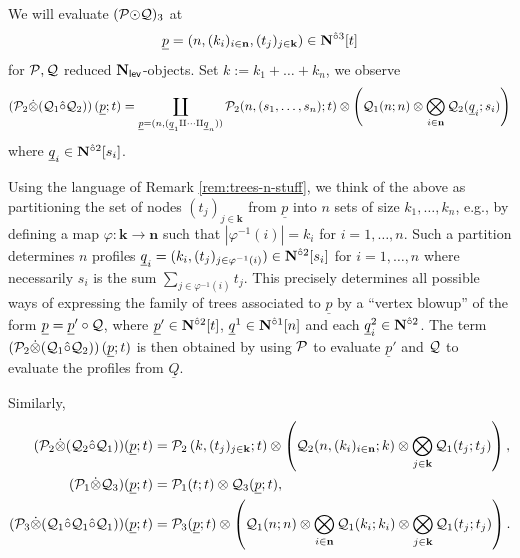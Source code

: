 \begin{example} 
We will evaluate $(\mathcal{P}{\odot}\mathcal{Q})_3$ at \[\underline{p}=(n, (k_i)_{i\in \mathbf{n}}, (t_j)_{j\in \mathbf{k}})\in\mathbf{N}^{\hat{\circ}3}[t]\] for $\mathcal{P}, \mathcal{Q}$ reduced $\mathbf{N}_{\mathsf{lev}}$-objects. Set $k:=k_1+\dots+k_n$, we observe \[ \left(\mathcal{P}_2\dot{\otimes}(\mathcal{Q}_1\hat{\circ}\mathcal{Q}_2) \right)(\underline{p};t)=
\coprod_{\underline{p}=(n,(\underline{q}_1\amalg \cdots \amalg \underline{q}_n))} \mathcal{P}_2(n, (s_1,\dots,s_n); t)\otimes \left( \mathcal{Q}_1(n;n)\otimes \bigotimes_{i\in\mathbf{n}} \mathcal{Q}_2 (\underline{q}_i;s_i)\right)\]
where  $\underline{q}_i\in \mathbf{N}^{\hat{\circ}2}[s_i]$. 

Using the language of Remark \ref{rem:trees-n-stuff}, we think of the above as partitioning the set of nodes $(t_j)_{j\in\mathbf{k}}$ from $\underline{p}$ into $n$ sets of size $k_1,\dots,k_n$, e.g., by defining a map $\varphi\colon \mathbf{k}\to\mathbf{n}$ such that $|\varphi^{-1}(i)|=k_i$ for $i=1,\dots,n$. Such a partition determines $n$ profiles $\underline{q}_i=(k_i,(t_j)_{j\in\varphi^{-1}(i)}) \in \mathbf{N}^{\hat{\circ}2}[s_i]$ for $i=1,\dots,n$ where necessarily $s_i$ is the sum $\sum_{j\in \varphi^{-1}(i)} t_j$. This precisely determines all possible ways of expressing the family of trees associated to $\underline{p}$ by a ``vertex blowup'' of the form $\underline{p}=\underline{p}'\circ \mathcal{Q}$, where $\underline{p}'\in \mathbf{N}^{\hat{\circ}2}[t]$, $\underline{q}^1\in \mathbf{N}^{\hat{\circ}1}[n]$ and each $\underline{q}^2_i\in \mathbf{N}^{\hat{\circ}2}$. The term $\left(\mathcal{P}_2\dot{\otimes}(\mathcal{Q}_1\hat{\circ}\mathcal{Q}_2) \right)(\underline{p};t)$ is then obtained by using $\mathcal{P}$ to evaluate $\underline{p}'$ and $\mathcal{Q}$ to evaluate the profiles from $\underline{Q}$. %


Similarly, \begin{align*}  
(\mathcal{P}_2\dot{\otimes} (\mathcal{Q}_2 \hat{\circ} \mathcal{Q}_1))(\underline{p};t) &
=\mathcal{P}_2 \left(k, (t_j)_{j\in\mathbf{k}};t\right)\otimes \left( \mathcal{Q}_2(n, (k_i)_{i\in \mathbf{n}}; k) \otimes \bigotimes_{j\in\mathbf{k}} \mathcal{Q}_1(t_j;t_j) \right), 
 \\
(\mathcal{P}_1\dot{\otimes} \mathcal{Q}_3)(\underline{p};t) & = \mathcal{P}_1(t;t)\otimes \mathcal{Q}_3(\underline{p};t),
 \\
(\mathcal{P}_3\dot{\otimes}(\mathcal{Q}_1\hat{\circ}\mathcal{Q}_1\hat{\circ}\mathcal{Q}_1))(\underline{p};t) & 
=\mathcal{P}_3(\underline{p};t)\otimes \left( \mathcal{Q}_1(n;n) \otimes \bigotimes_{i\in\mathbf{n}} \mathcal{Q}_1(k_i;k_i) \otimes \bigotimes_{j\in\mathbf{k}} \mathcal{Q}_1(t_j;t_j)\right). 
\end{align*}
\end{example}

